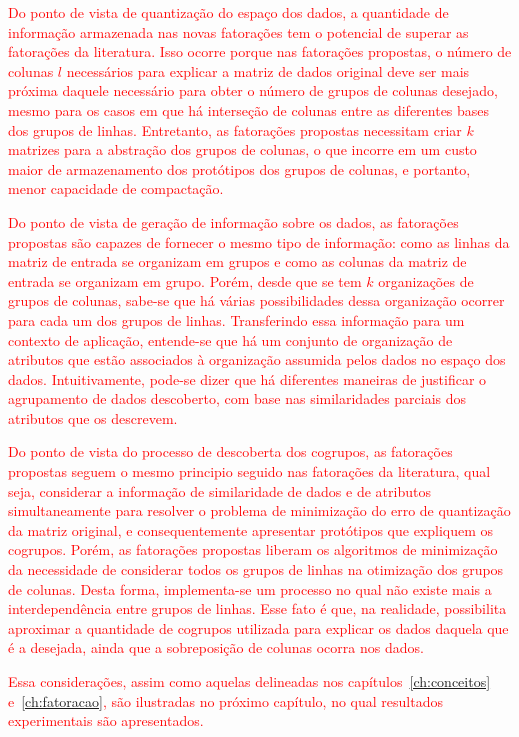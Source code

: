\documentclass[
    12pt,                %
    oneside,            %
    a4paper,            %
    english,            %
    brazil                %
    ]{abntex2ppgsi}
\begin{document}
\textcolor{red}{Do ponto de vista de quantização do espaço dos dados, a quantidade de informação armazenada nas novas fatorações tem o potencial de superar as fatorações da literatura. Isso ocorre porque nas fatorações propostas, o número de colunas $l$ necessários para explicar a matriz de dados original deve ser mais próxima daquele necessário para obter o número de grupos de colunas desejado, mesmo para os casos em que há interseção de colunas entre as diferentes bases dos grupos de linhas. Entretanto, as fatorações propostas necessitam criar $k$ matrizes para a abstração dos grupos de colunas, o que incorre em um custo maior de armazenamento dos protótipos dos grupos de colunas, e portanto, menor capacidade de compactação.}

\textcolor{red}{Do ponto de vista de geração de informação sobre os dados, as fatorações propostas são capazes de fornecer o mesmo tipo de informação: como as linhas da matriz de entrada se organizam em grupos e como as colunas da matriz de entrada se organizam em grupo. Porém, desde que se tem $k$ organizações de grupos de colunas, sabe-se que há várias possibilidades dessa organização ocorrer para cada um dos grupos de linhas. Transferindo essa informação para um contexto de aplicação, entende-se que há um conjunto de organização de atributos que estão associados à organização assumida pelos dados no espaço dos dados. Intuitivamente, pode-se dizer que há diferentes maneiras de justificar o agrupamento de dados descoberto, com base nas similaridades parciais dos atributos que os descrevem.}

\textcolor{red}{Do ponto de vista do processo de descoberta dos cogrupos, as fatorações propostas seguem o mesmo principio seguido nas fatorações da literatura, qual seja, considerar a informação de similaridade de dados e de atributos simultaneamente para resolver o problema de minimização do erro de quantização da matriz original, e consequentemente apresentar protótipos que expliquem os cogrupos. Porém, as fatorações propostas liberam os algoritmos de minimização da necessidade de considerar todos os grupos de linhas na otimização dos grupos de colunas. Desta forma, implementa-se um processo no qual não existe mais a interdependência entre grupos de linhas. Esse fato é que, na realidade, possibilita aproximar a quantidade de cogrupos utilizada para explicar os dados daquela que é a desejada, ainda que a sobreposição de colunas ocorra nos dados.}

\textcolor{red}{Essa considerações, assim como aquelas delineadas nos capítulos~\ref{ch:conceitos} e~\ref{ch:fatoracao}, são ilustradas no próximo capítulo, no qual resultados experimentais são apresentados.}
\end{document}

